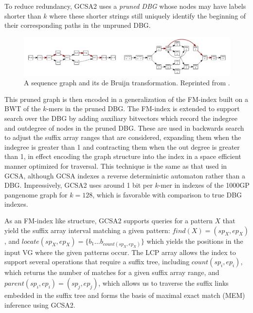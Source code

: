 To reduce redundancy, GCSA2 uses a \emph{pruned DBG} whose nodes may have labels shorter than $k$ where these shorter strings still uniquely identify the beginning of their corresponding paths in the unpruned DBG.

\begin{figure}[htbp!]
  \includegraphics[width=\textwidth]{Chapter2/Figs/sequence_graph_to_DBG.pdf}
  \caption[A sequence graph and its de Bruijn transformation]{
    A sequence graph and its de Bruijn transformation.
    Reprinted from \cite{siren2017indexing}.
  }
  \label{fig:seq_graph_to_dbg}
\end{figure}


This pruned graph is then encoded in a generalization of the FM-index built on a BWT of the $k$-mers in the pruned DBG.
The FM-index is extended to support search over the DBG by adding auxiliary bitvectors which record the indegree and outdegree of nodes in the pruned DBG.
These are used in backwards search to adjust the suffix array ranges that are considered, expanding them when the indegree is greater than 1 and contracting them when the out degree is greater than 1, in effect encoding the graph structure into the index in a space efficient manner optimized for traversal.
This technique is the same as that used in GCSA, although GCSA indexes a reverse deterministic automaton rather than a DBG.
Impressively, GCSA2 uses around 1 bit per $k$-mer in indexes of the 1000GP pangenome graph for $k=128$, which is favorable with comparison to true DBG indexes.

As an FM-index like structure, GCSA2 supports queries for a pattern $X$ that yield the suffix array interval matching a given pattern: $find(X) = ( sp_{X}, ep_{X} )$, and $locate( sp_{X}, ep_{X} ) = \{ b_1 \ldots b_{count(sp_{X}, ep_{X})} \}$ which yields the positions in the input VG where the given patterns occur.
The LCP array allows the index to support several operations that require a suffix tree, including $count(sp_i, ep_i)$, which returns the number of matches for a given suffix array range, and $parent(sp_i, ep_i) = (sp_j, ep_j)$, which allows us to traverse the suffix links embedded in the suffix tree and forms the basis of maximal exact match (MEM) inference using GCSA2.

